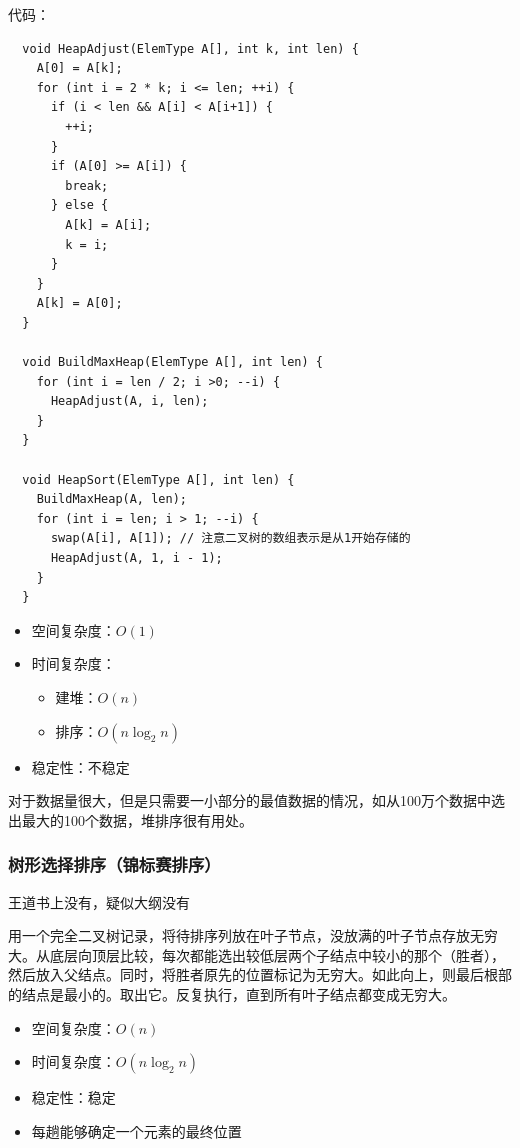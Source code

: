 \documentclass[12pt, a4paper, oneside]{ctexart}
\begin{document}
代码：
\begin{lstlisting}
  void HeapAdjust(ElemType A[], int k, int len) {
    A[0] = A[k];
    for (int i = 2 * k; i <= len; ++i) {
      if (i < len && A[i] < A[i+1]) {
        ++i;
      }
      if (A[0] >= A[i]) {
        break;
      } else {
        A[k] = A[i];
        k = i;
      }
    }
    A[k] = A[0];
  }

  void BuildMaxHeap(ElemType A[], int len) {
    for (int i = len / 2; i >0; --i) {
      HeapAdjust(A, i, len);
    }
  }

  void HeapSort(ElemType A[], int len) {
    BuildMaxHeap(A, len);
    for (int i = len; i > 1; --i) {
      swap(A[i], A[1]); // 注意二叉树的数组表示是从1开始存储的
      HeapAdjust(A, 1, i - 1);
    }
  }
\end{lstlisting}

\begin{itemize}
  \item 空间复杂度：$O(1)$
  \item 时间复杂度：
  \begin{itemize}
    \item 建堆：$O(n)$
    \item 排序：$O(n\log_2 n)$
  \end{itemize}
  \item 稳定性：不稳定
\end{itemize}

对于数据量很大，但是只需要一小部分的最值数据的情况，如从100万个数据中选出最大的100个数据，堆排序很有用处。

\subsubsection{树形选择排序（锦标赛排序）}

\textcolor{juice-orange}{王道书上没有，疑似大纲没有}

用一个完全二叉树记录，将待排序列放在叶子节点，没放满的叶子节点存放无穷大。从底层向顶层比较，每次都能选出较低层两个子结点中较小的那个（胜者），然后放入父结点。同时，将胜者原先的位置标记为无穷大。如此向上，则最后根部的结点是最小的。取出它。反复执行，直到所有叶子结点都变成无穷大。

\begin{itemize}
  \item 空间复杂度：$O(n)$
  \item 时间复杂度：$O(n\log_2 n)$
  \item 稳定性：稳定
  \item 每趟能够确定一个元素的最终位置
\end{itemize}
\end{document}
